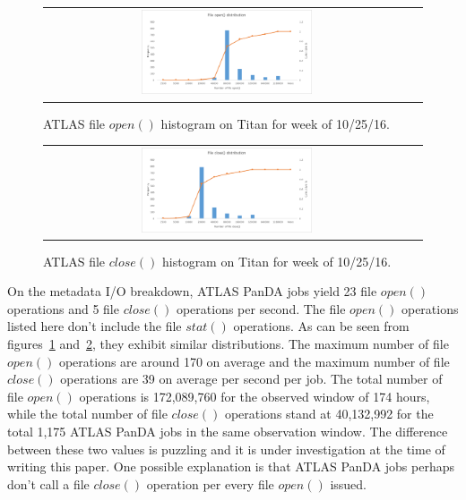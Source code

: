 \begin{figure}[!htb]
    \centering
    \begin{tabular}{cc}
        {\includegraphics[width=0.48\textwidth]{figures/panda_file_open_hist.pdf}}\\
    \end{tabular}
    \caption{ATLAS file $open()$ histogram on Titan for week of 10/25/16.}
\label{fig:atlas-titan-file-open}
\end{figure}

\begin{figure}[!htb]
    \centering
    \begin{tabular}{cc}
        {\includegraphics[width=0.48\textwidth]{figures/panda_file_close_hist.pdf}}\\
    \end{tabular}
    \caption{ATLAS file $close()$ histogram on Titan for week of 10/25/16.}
\label{fig:atlas-titan-file-close}
\end{figure}

On the metadata I/O breakdown, ATLAS PanDA jobs yield 23 file $open()$
operations and 5 file $close()$ operations per second. The file $open()$
operations listed here don't include the file $stat()$ operations. As can be
seen from figures~\ref{fig:atlas-titan-file-open}
and~\ref{fig:atlas-titan-file-close}, they exhibit similar distributions. The
maximum number of file $open()$ operations are around 170 on average and the
maximum number of file $close()$ operations are 39 on average per second per
job. The total number of file $open()$ operations is 172,089,760 for the
observed window of 174 hours, while the total number of file $close()$
operations stand at 40,132,992 for the total 1,175 ATLAS PanDA jobs in the same
observation window. The difference between these two values is puzzling and it
is under investigation at the time of writing this paper. One possible
explanation is that ATLAS PanDA jobs perhaps don't call a file $close()$
operation per every file $open()$ issued.

